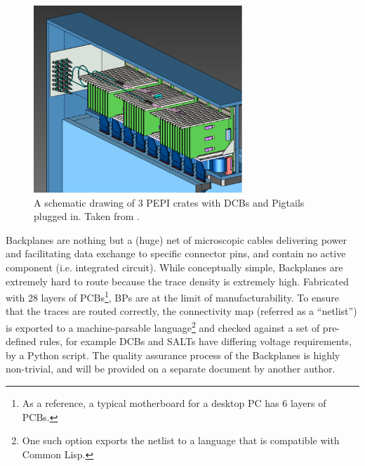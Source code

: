 \begin{figure}[!htb]
    \centering
    \includegraphics[width=0.7\textwidth]{./figs-ut-upgrade/detector/pepi_crates.pdf}
    \caption{
        A schematic drawing of 3 PEPI crates with DCBs and Pigtails plugged in.
        Taken from \cite{Andrews:2018vla}.
    }
    \label{fig:pepi-crate}
\end{figure}

Backplanes are nothing but a (huge) net of microscopic cables delivering power
and facilitating data exchange to specific connector pins, and contain no active
component (i.e. integrated circuit).
While conceptually simple, Backplanes are extremely hard to route because the
trace density is extremely high.
Fabricated with 28 layers of PCBs\footnote{
    As a reference, a typical motherboard for a desktop PC has 6 layers of PCBs.
}, BPs are at the limit of manufacturability.
To ensure that the traces are routed correctly,
the connectivity map (referred as a ``netlist'') is exported to a
machine-parsable language\footnote{
    One such option exports the netlist to a language that is compatible with
    Common Lisp.
} and checked against a set of pre-defined rules, for example DCBs and
SALTs have differing voltage requirements,
by a Python script.
The quality assurance process of the Backplanes is highly non-trivial, and will
be provided on a separate document by another author.

